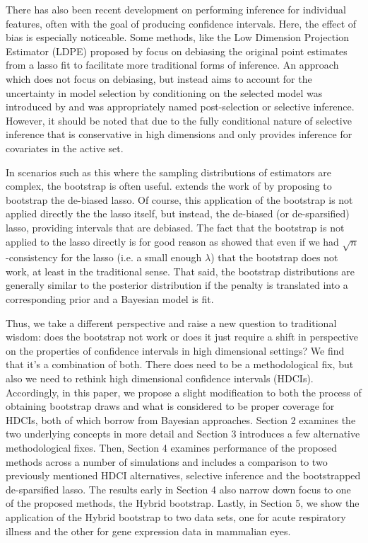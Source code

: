 There has also been recent development on performing inference for individual features, often with the goal of producing confidence intervals. Here, the effect of bias is especially noticeable. Some methods, like the Low Dimension Projection Estimator (LDPE) proposed by \cite{ZhangZhang2014} focus on debiasing the original point estimates from a lasso fit to facilitate more traditional forms of inference. An approach which does not focus on debiasing, but instead aims to account for the uncertainty in model selection by conditioning on the selected model was introduced by \cite{LeeEtAl2016} and was appropriately named post-selection or selective inference. However, it should be noted that due to the fully conditional nature of selective inference that is conservative in high dimensions and only provides inference for covariates in the active set.

In scenarios such as this where the sampling distributions of estimators are complex, the bootstrap is often useful. \cite{Dezeure2017} extends the work of \cite{ZhangZhang2014} by proposing to bootstrap the de-biased lasso. Of course, this application of the bootstrap is not applied directly the the lasso itself, but instead, the de-biased (or de-sparsified) lasso, providing intervals that are debiased. The fact that the bootstrap is not applied to the lasso directly is for good reason as \cite{Chatterjee2010} showed that even if we had $\sqrt{n}$-consistency for the lasso (i.e. a small enough $\lambda$) that the bootstrap does not work, at least in the traditional sense. That said, the bootstrap distributions are generally similar to the posterior distribution if the penalty is translated into a corresponding prior and a Bayesian model is fit.

Thus, we take a different perspective and raise a new question to traditional wisdom: does the bootstrap not work or does it just require a shift in perspective on the properties of confidence intervals in high dimensional settings? We find that it's a combination of both. There does need to be a methodological fix, but also we need to rethink high dimensional confidence intervals (HDCIs). Accordingly, in this paper, we propose a slight modification to both the process of obtaining bootstrap draws and what is considered to be proper coverage for HDCIs, both of which borrow from Bayesian approaches. Section 2 examines the two underlying concepts in more detail and Section 3 introduces a few alternative methodological fixes. Then, Section 4 examines performance of the proposed methods across a number of simulations and includes a comparison to two previously mentioned HDCI alternatives, selective inference and the bootstrapped de-sparsified lasso. The results early in Section 4 also narrow down focus to one of the proposed methods, the Hybrid bootstrap. Lastly, in Section 5, we show the application of the Hybrid bootstrap to two data sets, one for acute respiratory illness and the other for gene expression data in mammalian eyes.

